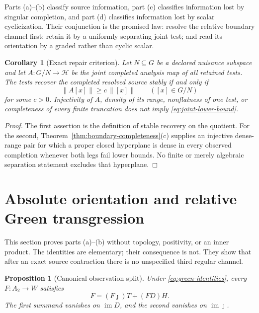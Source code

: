 \documentclass[11pt]{article}
\newtheorem{proposition}[theorem]{Proposition}
\newtheorem{corollary}[theorem]{Corollary}
\theoremstyle{definition}
\theoremstyle{remark}
\newcommand{\cH}{\mathcal H}
\newcommand{\im}{\operatorname{im}}
\begin{document}
Parts (a)--(b) classify source information, part (c) classifies information
lost by singular completion, and part (d) classifies information lost by
scalar cyclicization.  Their conjunction is the promised law: resolve the
relative boundary channel first; retain it by a uniformly separating joint
test; and read its orientation by a graded rather than cyclic scalar.

\begin{corollary}[Exact repair criterion]
\label{cor:repair}
Let \(N\subseteq G\) be a declared nuisance subspace and let
\(A:G/N\to\cH\) be the joint completed analysis map of all retained tests.
The tests recover the completed resolved source stably if and only if
\[
                  \|A[x]\|\ge c\,\|[x]\|
                  \qquad([x]\in G/N)
\tag{2.10}\label{eq:joint-lower-bound}
\]
for some \(c>0\).  Injectivity of \(A\), density of its range, nonflatness
of one test, or completeness of every finite truncation does not imply
\eqref{eq:joint-lower-bound}.
\end{corollary}

\begin{proof}
The first assertion is the definition of stable recovery on the quotient.
For the second, Theorem~\ref{thm:boundary-completeness}(c) supplies an
injective dense-range pair for which a proper closed hyperplane is dense in
every observed completion whenever both legs fail lower bounds.  No finite
or merely algebraic separation statement excludes that hyperplane.
\end{proof}

\section{Absolute orientation and relative Green transgression}
\label{sec:green}

This section proves parts (a)--(b) without topology, positivity, or an inner
product.  The identities are elementary; their consequence is not.  They
show that after an exact source contraction there is no unspecified third
regular channel.

\begin{proposition}[Canonical observation split]
\label{prop:green-split}
Under \eqref{eq:green-identities}, every \(F:A_2\to W\) satisfies
\[
                    F=(F\jmath)T+(FD)H.
\tag{3.1}\label{eq:green-observer-split}
\]
The first summand vanishes on \(\im D\), and the second vanishes on
\(\im\jmath\).
\end{proposition}
\end{document}
